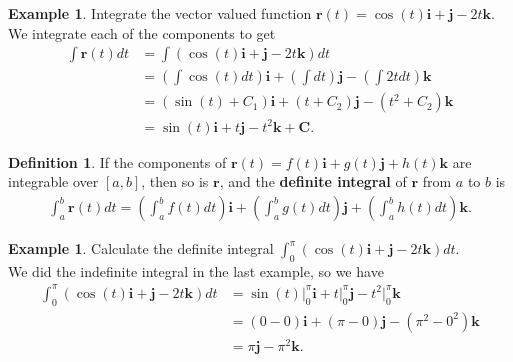 \documentclass[12pt, letter]{article}
\theoremstyle{plain}
\numberwithin{theorem}{section}
\theoremstyle{definition}
\newtheorem{definition}[theorem]{Definition}
\newtheorem{example}[theorem]{Example}
\begin{document}
\bigskip

\hrulefill

\bigskip

\begin{example}
Integrate the vector valued function $\bm{r}(t) = \cos(t) \bm{i} + \bm{j} - 2t \bm{k}$.\\
We integrate each of the components to get
\begin{align*}
\int \bm{r}(t) dt &= \int (\cos(t) \bm{i} + \bm{j} - 2t \bm{k})dt\\
&= \left(\int \cos(t)dt\right)\bm{i} + \left(\int dt \right) \bm{j} - \left(\int 2tdt \right) \bm{k}\\
&= (\sin(t)+C_1)\bm{i} + (t+C_2) \bm{j} - (t^2+C_2)\bm{k}\\
&= \sin(t) \bm{i} + t\bm{j} - t^2 \bm{k} + \bm{C}.
\end{align*}
\end{example}

\bigskip

\hrulefill

\bigskip

\begin{definition}
If the components of $\bm{r}(t) = f(t) \bm{i} + g(t) \bm{j} + h(t) \bm{k}$ are integrable over $[a,b]$, then so is $\bm{r}$, and the \textbf{definite integral} of $\bm{r}$ from $a$ to $b$ is
\begin{align*}
\int_a^b \bm{r}(t)dt = \left(\int_a^b f(t)dt \right) \bm{i} + \left(\int_a^b g(t)dt \right) \bm{j} + \left(\int_a^b h(t)dt \right) \bm{k}.
\end{align*}
\end{definition}

\bigskip

\hrulefill

\bigskip

\begin{example}
Calculate the definite integral $\int_0^\pi \left(\cos(t) \bm{i} + \bm{j} - 2t \bm{k}\right)dt$.\\
We did the indefinite integral in the last example, so we have
\begin{align*}
\int_0^\pi (\cos(t) \bm{i} + \bm{j} - 2t \bm{k})dt &= \sin(t)\rvert_0^\pi \bm{i} + t\rvert_0^\pi \bm{j} - t^2\rvert_0^\pi \bm{k}\\
&= (0-0)\bm{i} + (\pi-0)\bm{j}-(\pi^2-0^2)\bm{k}\\
&= \pi \bm{j} -\pi^2\bm{k}.
\end{align*}
\end{example}
\end{document}
